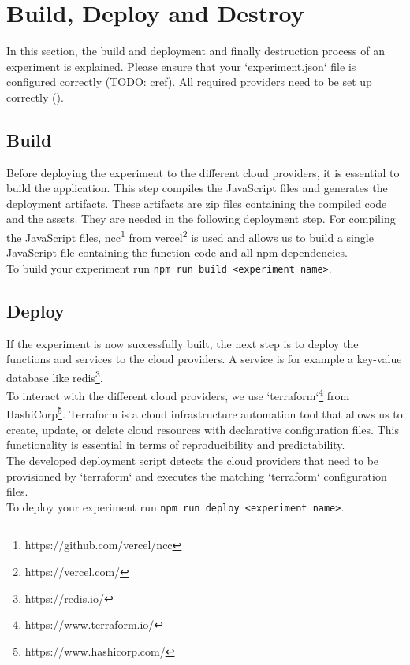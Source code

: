 \documentclass[../main.tex]{subfiles}
\begin{document}
\section{Build, Deploy and Destroy}\label{sec:builddeployanddestroy}
In this section, the build and deployment and finally destruction process of an experiment is explained. Please ensure that your `experiment.json` file is configured correctly (TODO: cref). All required providers need to be set up correctly ().

\subsection{Build}\label{sec:build}
Before deploying the experiment to the different cloud providers, it is essential to build the application. This step compiles the JavaScript files and generates the deployment artifacts. These artifacts are zip files containing the compiled code and the assets. They are needed in the following deployment step. For compiling the JavaScript files, ncc\footnote{https://github.com/vercel/ncc} from vercel\footnote{https://vercel.com/} is used and allows us to build a single JavaScript file containing the function code and all npm dependencies.\\
To build your experiment run \texttt{npm run build <experiment name>}.

\subsection{Deploy}\label{sec:deploy}
If the experiment is now successfully built, the next step is to deploy the functions and services to the cloud providers. A service is for example a key-value database like redis\footnote{https://redis.io/}. \\
To interact with the different cloud providers, we use `terraform`\footnote{https://www.terraform.io/} from HashiCorp\footnote{https://www.hashicorp.com/}. Terraform is a cloud infrastructure automation tool that allows us to create, update, or delete cloud resources with declarative configuration files. This functionality is essential in terms of reproducibility and predictability.\\
The developed deployment script detects the cloud providers that need to be provisioned by `terraform` and executes the matching `terraform` configuration files.\\
To deploy your experiment run \texttt{npm run deploy <experiment name>}.\\
\end{document}
